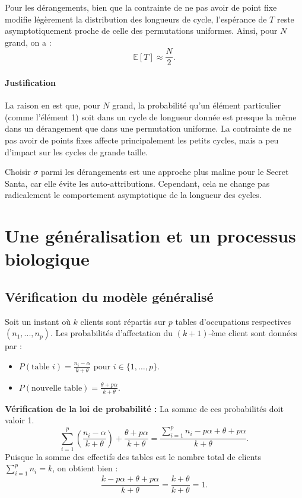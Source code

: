 \documentclass[12pt, a4paper]{article}
\theoremstyle{definition}
\theoremstyle{plain}
\begin{document}
Pour les dérangements, bien que la contrainte de ne pas avoir de point fixe modifie légèrement la distribution des longueurs de cycle, l'espérance de \( T \) reste asymptotiquement proche de celle des permutations uniformes. Ainsi, pour \( N \) grand, on a :
\[
\mathbb{E}[T] \approx \frac{N}{2}.
\]

\paragraph{Justification}
La raison en est que, pour \( N \) grand, la probabilité qu'un élément particulier (comme l'élément 1) soit dans un cycle de longueur donnée est presque la même dans un dérangement que dans une permutation uniforme. La contrainte de ne pas avoir de points fixes affecte principalement les petits cycles, mais a peu d'impact sur les cycles de grande taille.


Choisir \(\sigma\) parmi les dérangements est une approche plus maline pour le Secret Santa, car elle évite les auto-attributions. Cependant, cela ne change pas radicalement le comportement asymptotique de la longueur des cycles.

\section{Une généralisation et un processus biologique}

\subsection{Vérification du modèle généralisé}

Soit un instant où $k$ clients sont répartis sur $p$ tables d'occupations respectives $(n_{1},...,n_{p})$. Les probabilités d'affectation du $(k+1)$-ème client sont données par :
\begin{itemize}
    \item $P(\text{table } i) = \frac{n_{i}-\alpha}{k+\theta}$ pour $i \in \{1, \dots, p\}$.
    \item $P(\text{nouvelle table}) = \frac{\theta+p\alpha}{k+\theta}$.
\end{itemize}

\textbf{Vérification de la loi de probabilité :}
La somme de ces probabilités doit valoir 1. 
$$ \sum_{i=1}^{p} \left( \frac{n_{i}-\alpha}{k+\theta} \right) + \frac{\theta+p\alpha}{k+\theta} = \frac{\sum_{i=1}^{p} n_{i} - p\alpha + \theta + p\alpha}{k+\theta}. $$
Puisque la somme des effectifs des tables est le nombre total de clients $\sum_{i=1}^{p} n_{i} = k$, on obtient bien :
$$ \frac{k - p\alpha + \theta + p\alpha}{k+\theta} = \frac{k+\theta}{k+\theta} = 1. $$
\end{document}
